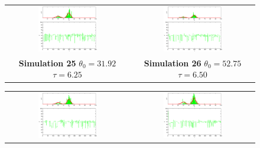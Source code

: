 \begin{figure}\label{fig: SimulationMetropolisHasting3}
\begin{tabular}{cc} 
\includegraphics[width=0.5\textwidth]{ImaginiLatex/MetropolisExample25.eps} &
\includegraphics[width=0.5\textwidth]{ImaginiLatex/MetropolisExample26.eps} \\
\textbf{Simulation 25} $\theta_0=   31.92$  $\tau=    6.25$  & \textbf{Simulation 26} $\theta_0=   52.75$  $\tau=    6.50$
\end{tabular}
\begin{tabular}{cc} 
\includegraphics[width=0.5\textwidth]{ImaginiLatex/MetropolisExample27.eps} &
\includegraphics[width=0.5\textwidth]{ImaginiLatex/MetropolisExample28.eps} \\

\end{tabular}
\end{figure}
